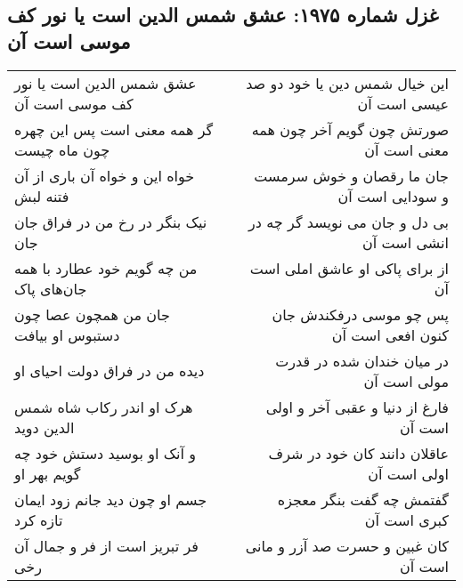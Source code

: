 \begin{center}
\section*{غزل شماره ۱۹۷۵: عشق شمس الدین است یا نور کف موسی است آن}
\label{sec:1975}
\begin{longtable}{l p{0.5cm} r}
عشق شمس الدین است یا نور کف موسی است آن
&&
این خیال شمس دین یا خود دو صد عیسی است آن
\\
گر همه معنی است پس این چهره چون ماه چیست
&&
صورتش چون گویم آخر چون همه معنی است آن
\\
خواه این و خواه آن باری از آن فتنه لبش
&&
جان ما رقصان و خوش سرمست و سودایی است آن
\\
نیک بنگر در رخ من در فراق جان جان
&&
بی دل و جان می نویسد گر چه در انشی است آن
\\
من چه گویم خود عطارد با همه جان‌های پاک
&&
از برای پاکی او عاشق املی است آن
\\
جان من همچون عصا چون دستبوس او بیافت
&&
پس چو موسی درفکندش جان کنون افعی است آن
\\
دیده من در فراق دولت احیای او
&&
در میان خندان شده در قدرت مولی است آن
\\
هرک او اندر رکاب شاه شمس الدین دوید
&&
فارغ از دنیا و عقبی آخر و اولی است آن
\\
و آنک او بوسید دستش خود چه گویم بهر او
&&
عاقلان دانند کان خود در شرف اولی است آن
\\
جسم او چون دید جانم زود ایمان تازه کرد
&&
گفتمش چه گفت بنگر معجزه کبری است آن
\\
فر تبریز است از فر و جمال آن رخی
&&
کان غبین و حسرت صد آزر و مانی است آن
\\
\end{longtable}
\end{center}
